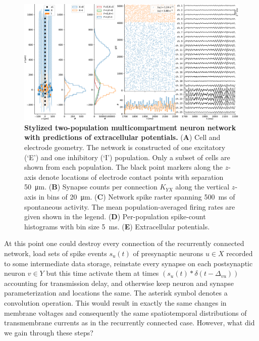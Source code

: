 \begin{figure}[!ht]
\begin{center}
\includegraphics[width=\textwidth]{Figures/Ch-LFPy/Ch-LFPy-network.pdf}
\end{center}
\caption{\textbf{Stylized two-population multicompartment neuron network with predictions of extracellular potentials.}
({\bf A}) Cell and electrode geometry. The network is constructed of one excitatory (`E') and one inhibitory (`I') population.
Only a subset of cells are shown from each population.
The black point markers along the $z$-axis denote locations of electrode contact points with separation \SI{50}{\micro\metre}. 
({\bf B}) Synapse counts per connection $K_{YX}$ along the vertical $z$-axis in bins of \SI{20}{\micro\metre}.
({\bf C}) Network spike raster spanning \SI{500}{\milli\second} of spontaneous activity. 
The mean population-averaged firing rates are given shown in the legend.
({\bf D}) Per-population spike-count histograms with bin size \SI{5}{\milli\second}.
({\bf E}) Extracellular potentials.
}
\label{fig:LFPy_network}
\end{figure}




At this point one could destroy every connection of the recurrently connected network,
load sets of spike events $s_u(t)$ of presynaptic neurons $u \in X$ recorded to some intermediate data storage,
reinstate every synapse on each postsynaptic neuron $v \in Y$ but this time activate them at times
$\left(s_u(t) \ast \delta(t-\Delta_{vu})\right)$
accounting for transmission delay,
and otherwise keep neuron and synapse parameterization and locations the same.
The asterisk symbol denotes a convolution operation.
This would result in exactly the same changes in membrane voltages and consequently the same spatiotemporal distributions of transmembrane currents as in the recurrently connected case.
However, what did we gain through these steps?

